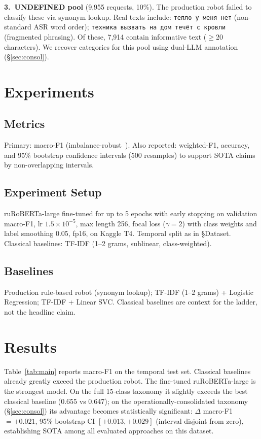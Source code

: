 \documentclass[11pt]{article}
\begin{document}
\textbf{3.~UNDEFINED pool} (9{,}955 requests, 10\%). The production robot
failed to classify these via synonym lookup. Real texts include:
\texttt{тепло у меня нет} (non-standard ASR word order); \texttt{техника
вызвать на дом течёт с кровли} (fragmented phrasing). Of these, 7{,}914
contain informative text ($\geq$20 characters). We recover categories for this
pool using dual-LLM annotation (\S\ref{sec:consol}).

\section{Experiments}
\subsection{Metrics}
Primary: macro-F1 (imbalance-robust~\cite{harbecke2022microf1}). Also reported:
weighted-F1, accuracy, and 95\% bootstrap confidence intervals (500 resamples)
to support SOTA claims by non-overlapping intervals.

\subsection{Experiment Setup}
ruRoBERTa-large fine-tuned for up to 5 epochs with early stopping on
validation macro-F1, lr $1.5\!\times\!10^{-5}$, max length 256, focal loss
($\gamma{=}2$) with class weights and label smoothing 0.05, fp16, on Kaggle
T4. Temporal split as in \S Dataset. Classical baselines: TF-IDF (1--2 grams,
sublinear, class-weighted).

\subsection{Baselines}
Production rule-based robot (synonym lookup); TF-IDF (1--2 grams) + Logistic
Regression; TF-IDF + Linear SVC. Classical baselines are context for the
ladder, not the headline claim.

\section{Results}
Table~\ref{tab:main} reports macro-F1 on the temporal test set. Classical
baselines already greatly exceed the production robot. The fine-tuned
ruRoBERTa-large is the strongest model. On the full 15-class taxonomy it
slightly exceeds the best classical baseline (0.655 vs 0.647); on the
operationally-consolidated taxonomy (\S\ref{sec:consol}) its advantage becomes
statistically significant: $\Delta$ macro-F1 $=+0.021$, 95\% bootstrap CI
$[+0.013, +0.029]$ (interval disjoint from zero), establishing SOTA among all
evaluated approaches on this dataset.
\end{document}
